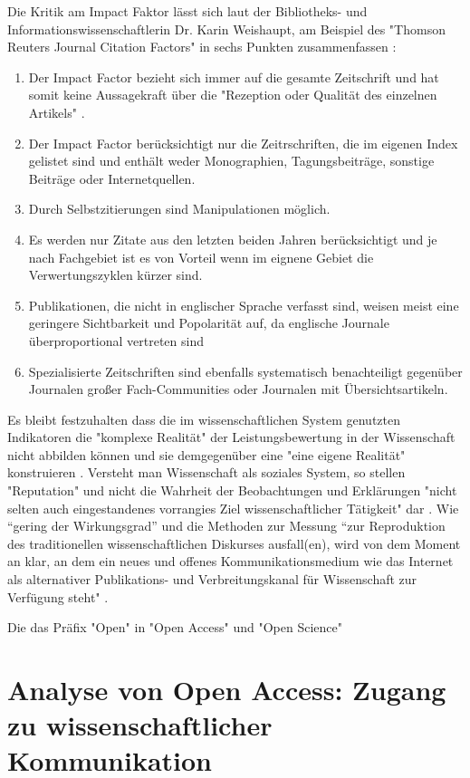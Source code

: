 Die Kritik am Impact Faktor lässt sich laut der Bibliotheks- und Informationswissenschaftlerin Dr. Karin Weishaupt, am Beispiel des "Thomson Reuters Journal Citation Factors" in sechs Punkten zusammenfassen \cite{weishaupt_2009_goldenOA}:
\begin{enumerate}
\item Der Impact Factor bezieht sich immer auf die gesamte Zeitschrift und hat somit keine Aussagekraft über die "Rezeption oder Qualität des einzelnen Artikels" .
\item Der Impact Factor berücksichtigt nur die Zeitrschriften, die im eigenen Index gelistet sind und enthält weder Monographien, Tagungsbeiträge, sonstige Beiträge oder Internetquellen.
\item Durch Selbstzitierungen sind Manipulationen möglich.
\item Es werden nur Zitate aus den letzten beiden Jahren berücksichtigt und je nach Fachgebiet ist es von Vorteil wenn im eignene Gebiet die Verwertungszyklen kürzer sind.
\item Publikationen, die nicht in englischer Sprache verfasst sind, weisen meist eine geringere Sichtbarkeit und Popolarität auf, da englische Journale überproportional vertreten sind
\item Spezialisierte Zeitschriften sind ebenfalls systematisch benachteiligt gegenüber Journalen großer Fach-Communities oder Journalen mit Übersichtsartikeln.
\end{enumerate}

Es bleibt festzuhalten dass die im wissenschaftlichen System genutzten Indikatoren die "komplexe Realität" der Leistungsbewertung in der Wissenschaft nicht abbilden können und sie demgegenüber eine "eine eigene Realität" konstruieren \cite{Hornbostel_1997}. Versteht man Wissenschaft als soziales System, so stellen "Reputation" und nicht die Wahrheit der Beobachtungen und Erklärungen "nicht selten auch eingestandenes vorrangies Ziel wissenschaftlicher Tätigkeit" dar \cite{luhmann_1970_selbststeuerung}. Wie “gering der Wirkungsgrad” und die Methoden zur Messung “zur Reproduktion des traditionellen wissenschaftlichen Diskurses ausfall(en), wird von dem Moment an klar, an dem ein neues und offenes Kommunikationsmedium wie das Internet als alternativer Publikations- und Verbreitungskanal für Wissenschaft zur Verfügung steht" \cite{Rost_1998}. 

Die das Präfix "Open" in "Open Access" und "Open Science" 


\section{Analyse von Open Access: Zugang zu wissenschaftlicher Kommunikation} 

